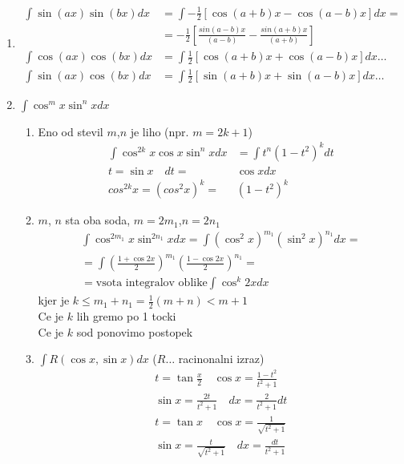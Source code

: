 \documentclass[a4paper,oneside,10pt]{article}
\theoremstyle{definition}
\newcommand\ogl[1]{\left[#1\right]}
\newcommand\okr[1]{\left(#1\right)}
\begin{document}
\begin{multicols}{2}
\begin{enumerate}
		\item 
		\begin{align*}
			\int \sin{(ax)}\sin{(bx)} dx &= \int -\frac{1}{2}\ogl{\cos{(a+b)x} - \cos{(a-b)x}}dx =\\ 
			&=-\frac{1}{2}\ogl{\frac{sin{(a-b)x}}{(a-b)} - \frac{sin{(a+b)x}}{(a+b)}}\\
			\int \cos{(ax)}\cos{(bx)} dx &= \int \frac{1}{2}\ogl{\cos{(a+b)x} + \cos{(a-b)x}}dx \dots\\
			\int \sin{(ax)}\cos{(bx)} dx &= \int \frac{1}{2}\ogl{\sin{(a+b)x} + \sin{(a-b)x}}dx \dots
		\end{align*}
		\item $\int \cos^{m}{x}\sin^{n}{x}dx$
		\begin{enumerate}
			\item Eno od stevil $m$,$n$ je liho (npr. $m = 2k + 1$)\\
			\begin{align*}
				\int \cos^{2k}{x}\cos{x}\sin^{n}{x}dx &= \int t^n (1-t^2)^k dt\\
				t = \sin{x} \quad dt =& \cos{x}dx\\
				cos^{2k}{x} = (cos^{2}{x})^k =& (1-t^2)^k
			\end{align*}
			\item $m$, $n$ sta oba soda, $m = 2m_1$,$n = 2n_1$\\
			\begin{align*}
				\int \cos^{2m_1}{x}\sin^{2n_1}{x}dx = \int (\cos^{2}{x})^{m_1}(\sin^{2}{x})^{n_1}dx=\\
				=\int \okr{\frac{1+\cos{2x}}{2}}^{m_1}\okr{\frac{1-\cos{2x}}{2}}^{n_1} =\\
				=\text{vsota integralov oblike} \int \cos^k{2x}dx
			\end{align*}
			kjer je $k \leq m_1 + n_1 = \frac{1}{2}(m+n) < m + 1$\\
			Ce je $k$ lih gremo po 1 tocki\\
			Ce je $k$ sod ponovimo postopek\\
			\item $\int R(\cos{x}, \sin{x})dx$ ($R \dots$ racinonalni izraz)\\
			\begin{align*}
				t  = \tan{\frac{x}{2}} \quad \cos{x} = \frac{1 - t^2}{t^2 + 1}\\
				\sin{x} = \frac{2t}{t^2 + 1} \quad dx = \frac{2}{t^2 + 1}dt\\
				t  = \tan{x} \quad \cos{x} = \frac{1}{\sqrt{t^2 + 1}}\\
				\sin{x} = \frac{t}{\sqrt{t^2 + 1}} \quad dx = \frac{dt}{t^2 + 1}\\
			\end{align*}
		\end{enumerate}					
	\end{enumerate}	
%

\end{multicols}
\end{document}
